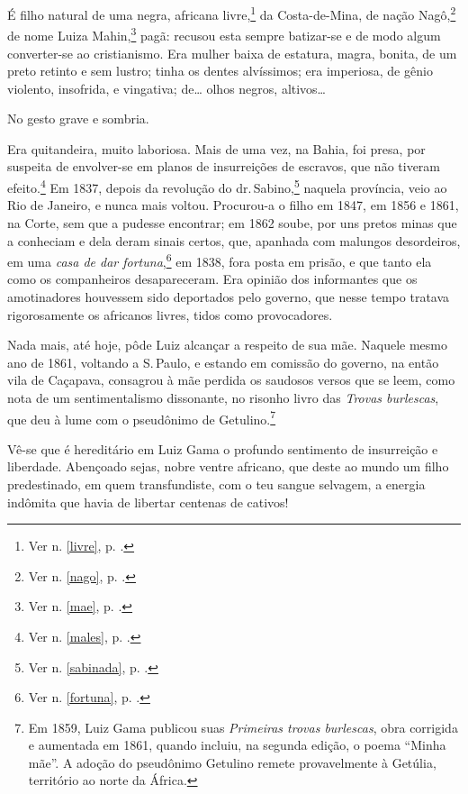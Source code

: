 É filho natural de uma negra, africana livre,\footnote{Ver n. \ref{livre}, p. \pageref{livre}.} da Costa-de-Mina, de nação
Nagô,\footnote{Ver n. \ref{nago}, p. \pageref{nago}.} de
nome Luiza Mahin,\footnote{Ver n. \ref{mae}, p. \pageref{mae}.} pagã: recusou esta sempre
batizar-se e de modo algum converter-se ao cristianismo. Era mulher
baixa de estatura, magra, bonita, de um preto retinto e sem lustro;
tinha os dentes alvíssimos; era imperiosa, de gênio violento, insofrida,
e vingativa; de\ldots{} olhos negros, altivos\ldots{}


No gesto grave e sombria.

Era quitandeira, muito laboriosa. Mais de uma vez, na Bahia, foi presa,
por suspeita de envolver-se em planos de insurreições de escravos, que
não tiveram efeito.\footnote{Ver n. \ref{males}, p. \pageref{males}.} Em 1837, depois da revolução do dr.\,Sabino,\footnote{Ver n. \ref{sabinada}, p. \pageref{sabinada}.}
naquela província, veio ao Rio de Janeiro, e nunca mais voltou.
Procurou-a o filho em 1847, em 1856 e 1861, na Corte, sem que a pudesse
encontrar; em 1862 soube, por uns pretos minas que a conheciam e dela
deram sinais certos, que, apanhada com malungos desordeiros, em uma
\emph{casa de dar fortuna},\footnote{Ver n. \ref{fortuna}, p. \pageref{fortuna}.} em 1838, fora posta em
prisão, e que tanto ela como os companheiros desapareceram. Era opinião
dos informantes que os amotinadores houvessem sido deportados pelo
governo, que nesse tempo tratava rigorosamente os africanos livres,
tidos como provocadores.

Nada mais, até hoje, pôde Luiz alcançar a respeito de sua mãe. Naquele
mesmo ano de 1861, voltando a S.\,Paulo, e estando em comissão do
governo, na então vila de Caçapava, consagrou à mãe perdida os saudosos
versos que se leem, como nota de um sentimentalismo dissonante, no
risonho livro das \emph{Trovas burlescas}, que deu à lume com o
pseudônimo de Getulino.\footnote{Em 1859, Luiz Gama publicou suas
  \emph{Primeiras trovas burlescas}, obra corrigida e aumentada em 1861,
  quando incluiu, na segunda edição, o poema ``Minha mãe''. A adoção
  do pseudônimo Getulino remete provavelmente à Getúlia, território ao
  norte da África.}

Vê-se que é hereditário em Luiz Gama o profundo sentimento de
insurreição e liberdade. Abençoado sejas, nobre ventre africano, que
deste ao mundo um filho predestinado, em quem transfundiste, com o teu
sangue selvagem, a energia indômita que havia de libertar centenas de
cativos!

